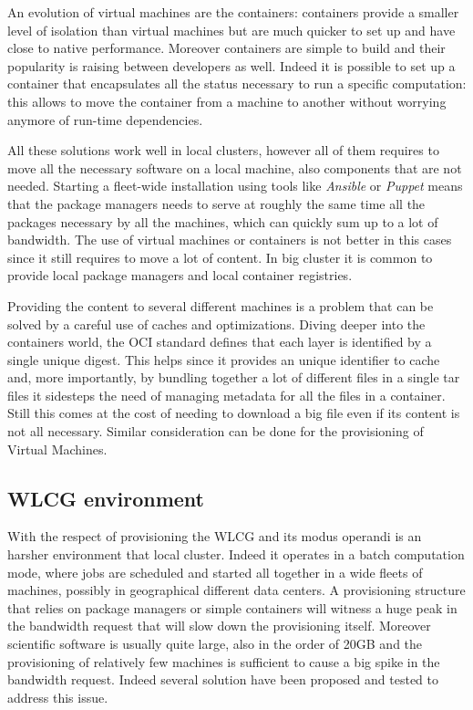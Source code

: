 An evolution of virtual machines are the containers: containers provide a
smaller level of isolation than virtual machines but are much quicker to set up
and have close to native performance. Moreover containers are simple to build
and their popularity is raising between developers as well. Indeed it is
possible to set up a container that encapsulates all the status necessary to
run a specific computation: this allows to move the container from a machine to
another without worrying anymore of run-time dependencies.

All these solutions work well in local clusters, however all of them requires
to move all the necessary software on a local machine, also components that are
not needed. Starting a fleet-wide installation using tools like
\textit{Ansible} or \textit{Puppet} means that the package managers needs to
serve at roughly the same time all the packages necessary by all the machines,
which can quickly sum up to a lot of bandwidth. The use of virtual machines or
containers is not better in this cases since it still requires to move a lot of
content. In big cluster it is common to provide local package managers and local
container registries.

Providing the content to several different machines is a problem that can be
solved by a careful use of caches and optimizations. Diving deeper into the
containers world, the OCI standard defines that each layer is identified by a
single unique digest. This helps since it provides an unique identifier to
cache and, more importantly, by bundling together a lot of different files in a
single tar files it sidesteps the need of managing metadata for all the files in
a container. Still this comes at the cost of needing to download a big file
even if its content is not all necessary. Similar consideration can be done for
the provisioning of Virtual Machines.

\subsection{WLCG environment} \label{subsec:soawlcg}

With the respect of provisioning the WLCG and its modus operandi is an harsher
environment that local cluster. Indeed it operates in a batch computation mode,
where jobs are scheduled and started all together in a wide fleets of machines,
possibly in geographical different data centers. A provisioning structure that
relies on package managers or simple containers will witness a huge peak in
the bandwidth request that will slow down the provisioning itself.  Moreover
scientific software is usually quite large, also in the order of 20GB and the
provisioning of relatively few machines is sufficient to cause a big spike in
the bandwidth request. Indeed several solution have been proposed and tested to
address this issue.

